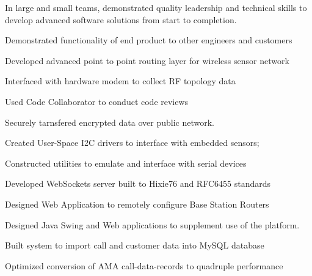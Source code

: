 \documentclass[letterpaper]{deedy-resume} %
\begin{document}
\begin{minipage}[t]{0.66\textwidth}
\sectionspace %




\vspace{\topsep} %
In large and small teams, demonstrated quality leadership and technical skills to develop advanced
software solutions from start to completion.
\vspace{\topsep} %
\vspace{\topsep} %
\begin{tightitemize}
\item Demonstrated functionality of end product to other engineers and customers
\item Developed advanced point to point routing layer for wireless sensor network
\item Interfaced with hardware modem to collect RF topology data
\item Used Code Collaborator to conduct code reviews
\item Securely tarnsfered encrypted data over public network.
\item Created User-Space I2C drivers to interface with embedded sensors;
\item Constructed utilities to emulate and interface with serial devices
\item Developed WebSockets server built to Hixie76 and RFC6455 standards
\item Designed Web Application to remotely configure Base Station Routers
\end{tightitemize}

\sectionspace %
\sectionspace %


\vspace{\topsep} %
\begin{tightitemize}
\item Designed Java Swing and Web applications to supplement use of the platform.
\item Built system to import call and customer data into MySQL database
\item Optimized conversion of AMA call-data-records to quadruple performance
\end{tightitemize}


\end{minipage}
\end{document}
